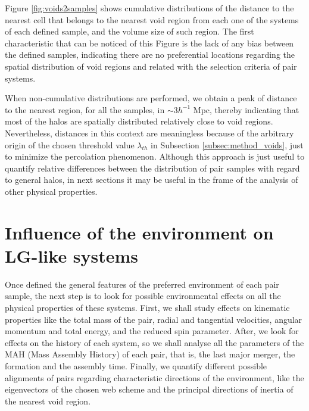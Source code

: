 \documentclass[usenatbib]{latex/mn2e}
\begin{document}
Figure \ref{fig:voids2samples} shows cumulative distributions of the 
distance to the nearest cell that belongs to the nearest void region from
each one of the systems of each defined sample, and the volume size of such 
region. The first characteristic that can be noticed of this Figure is the 
lack of any bias between the defined samples, indicating there are no 
preferential locations regarding the spatial distribution of void regions 
and related with the selection criteria of pair systems. 



When non-cumulative distributions are performed, we obtain a peak of 
distance to the nearest region, for all the samples, in $\sim 3 h^{-1}$ 
Mpc, thereby indicating that most of the halos are spatially distributed 
relatively close to void regions. Nevertheless, distances in this context 
are meaningless because of the arbitrary origin of the chosen threshold 
value $\lambda_{th}$ in Subsection \ref{subsec:method_voids}, just to 
minimize the percolation phenomenon. Although this approach is just useful 
to quantify relative differences between the distribution of pair samples 
with regard to general halos, in next sections it may be useful in the frame
of the analysis of other physical properties. 



\section{Influence of the environment on LG-like systems}
\label{sec:influence_environment_LG}



Once defined the general features of the preferred environment of each 
pair sample, the next step is to look for possible environmental effects 
on all the physical properties of these systems. First, we shall study 
effects on kinematic properties like the total mass of the pair, radial 
and tangential velocities, angular momentum and total energy, and the 
reduced spin parameter. After, we look for effects on the history of 
each system, so we shall analyse all the parameters of the MAH (Mass 
Assembly History) of each pair, that is, the last major merger, the 
formation and the assembly time. Finally, we quantify different possible 
alignments of pairs regarding characteristic directions of the environment, 
like the eigenvectors of the chosen web scheme and the principal 
directions of inertia of the nearest void region.
\end{document}
